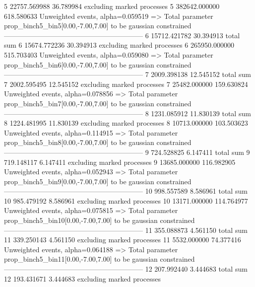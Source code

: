 5          22757.569988    36.789984       excluding marked processes    
5          382642.000000   618.580633      Unweighted events, alpha=0.059519
  => Total parameter prop_binch5_bin5[0.00,-7.00,7.00] to be gaussian constrained
------------------------------------------------------------
6          15712.421782    30.394913       total sum                     
6          15674.772236    30.394913       excluding marked processes    
6          265950.000000   515.703403      Unweighted events, alpha=0.059080
  => Total parameter prop_binch5_bin6[0.00,-7.00,7.00] to be gaussian constrained
------------------------------------------------------------
7          2009.398138     12.545152       total sum                     
7          2002.595495     12.545152       excluding marked processes    
7          25482.000000    159.630824      Unweighted events, alpha=0.078856
  => Total parameter prop_binch5_bin7[0.00,-7.00,7.00] to be gaussian constrained
------------------------------------------------------------
8          1231.085912     11.830139       total sum                     
8          1224.481995     11.830139       excluding marked processes    
8          10713.000000    103.503623      Unweighted events, alpha=0.114915
  => Total parameter prop_binch5_bin8[0.00,-7.00,7.00] to be gaussian constrained
------------------------------------------------------------
9          724.528825      6.147411        total sum                     
9          719.148117      6.147411        excluding marked processes    
9          13685.000000    116.982905      Unweighted events, alpha=0.052943
  => Total parameter prop_binch5_bin9[0.00,-7.00,7.00] to be gaussian constrained
------------------------------------------------------------
10         998.557589      8.586961        total sum                     
10         985.479192      8.586961        excluding marked processes    
10         13171.000000    114.764977      Unweighted events, alpha=0.075815
  => Total parameter prop_binch5_bin10[0.00,-7.00,7.00] to be gaussian constrained
------------------------------------------------------------
11         355.088873      4.561150        total sum                     
11         339.250143      4.561150        excluding marked processes    
11         5532.000000     74.377416       Unweighted events, alpha=0.064188
  => Total parameter prop_binch5_bin11[0.00,-7.00,7.00] to be gaussian constrained
------------------------------------------------------------
12         207.992440      3.444683        total sum                     
12         193.431671      3.444683        excluding marked processes    

